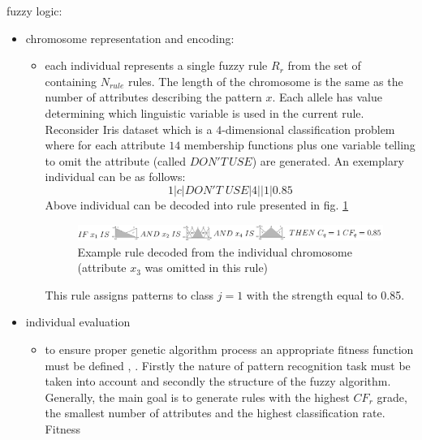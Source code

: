 fuzzy logic:
\begin{itemize}
    \item chromosome representation and encoding: 
        \begin{itemize}
            \item each individual represents a single fuzzy rule $R_r$ from the
                set of containing $N_{rule}$ rules.
                The length of the chromosome is the same as the number of 
                attributes describing the pattern $x$. Each allele has value
                determining which linguistic variable is used in the current
                rule. Reconsider Iris dataset which is a $4$-dimensional
                classification problem where for each attribute $14$
                membership functions plus one variable telling to omit the
                attribute (called $DON'T \,USE$) are generated. 
                An exemplary individual can be as follows:
                $$1|c|DON'T \;USE|4||1|0.85$$
                Above individual can be decoded into rule presented in fig.
                \ref{fig:fuzzy_rule}
                \begin{figure}[H]
                    \begin{center}
                        \includegraphics[width=\textwidth]{fig/fuzzy_rule.png}
                    \end{center}
                    \caption{Example rule decoded from the individual
                    chromosome (attribute $x_3$ was omitted in this rule)}
                    \label{fig:fuzzy_rule}
                \end{figure}  
                This rule assigns patterns to class $j=1$ with the strength equal to 0.85.
        \end{itemize}
    \item individual evaluation
        \begin{itemize}
            \item to ensure proper genetic algorithm process an appropriate
                fitness function must be defined \cite{bib10}, \cite{bib21}. 
                Firstly the nature of pattern recognition task must be taken 
                into account and secondly the structure of the fuzzy algorithm. 
                Generally, the main goal is
                to generate rules with the highest $CF_r$ grade, the smallest number
                of attributes and the highest classification rate. Fitness

\end{itemize}
\end{itemize}

